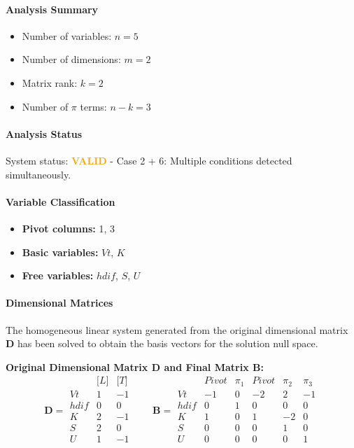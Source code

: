 \paragraph{Analysis Summary}
\begin{itemize}
\item Number of variables: $n = 5$
\item Number of dimensions: $m = 2$
\item Matrix rank: $k = 2$
\item Number of $\pi$ terms: $n - k = 3$
\end{itemize}

\paragraph{Analysis Status}
System status: \textcolor{orange}{\textbf{VALID}} - Case 2 + 6: Multiple conditions detected simultaneously.

\paragraph{Variable Classification}
\begin{itemize}
\item \textbf{Pivot columns:} 1, 3
\item \textbf{Basic variables:} $Vt$, $K$
\item \textbf{Free variables:} $hdif$, $S$, $U$
\end{itemize}

\paragraph{Dimensional Matrices}
The homogeneous linear system generated from the original dimensional matrix $\mathbf{D}$ has been solved to obtain the basis vectors for the solution null space.

\textbf{Original Dimensional Matrix $\mathbf{D}$ and Final Matrix $\mathbf{B}$:}
\begin{equation}\mathbf{D} = \begin{array}{r|rr}
& \text{[}L\text{]} & \text{[}T\text{]} \\
\hline
Vt & 1 & -1 \\
hdif & 0 & 0 \\
K & 2 & -1 \\
S & 2 & 0 \\
U & 1 & -1 \\
\end{array}
\qquad
\mathbf{B} = \begin{array}{r|rrrrr}
& Pivot & \pi_{1} & Pivot & \pi_{2} & \pi_{3} \\
\hline
Vt & -1 & 0 & -2 & 2 & -1 \\
hdif & 0 & 1 & 0 & 0 & 0 \\
K & 1 & 0 & 1 & -2 & 0 \\
S & 0 & 0 & 0 & 1 & 0 \\
U & 0 & 0 & 0 & 0 & 1 \\
\end{array}\end{equation}

